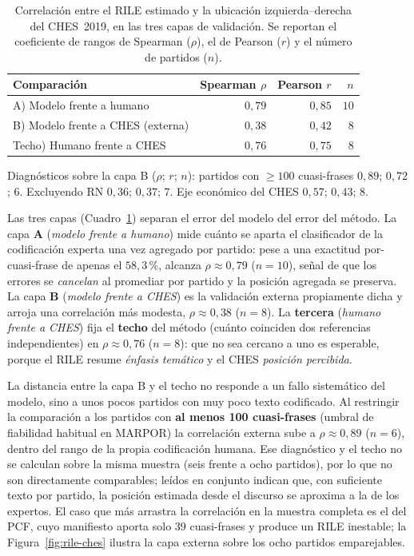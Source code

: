 \begin{table}[H]
\centering
\caption{Correlación entre el RILE estimado y la ubicación izquierda--derecha del
CHES~2019, en las tres capas de validación. Se reportan el coeficiente de rangos
de Spearman ($\rho$), el de Pearson ($r$) y el número de partidos ($n$).}
\label{tab:val-ches}
\begin{tabular}{@{}l r r r@{}}
\toprule
\textbf{Comparación} & \textbf{Spearman $\rho$} & \textbf{Pearson $r$} & \textbf{$n$} \\
\midrule
A) Modelo frente a humano & $0{,}79$ & $0{,}85$ & $10$ \\
B) Modelo frente a CHES (externa) & $0{,}38$ & $0{,}42$ & $8$ \\
Techo) Humano frente a CHES & $0{,}76$ & $0{,}75$ & $8$ \\
\bottomrule
\end{tabular}

{\footnotesize Diagnósticos sobre la capa B ($\rho$; $r$; $n$): partidos con
$\geq 100$ cuasi-frases $0{,}89$; $0{,}72$; $6$. Excluyendo RN $0{,}36$; $0{,}37$;
$7$. Eje económico del CHES $0{,}57$; $0{,}43$; $8$.}
\end{table}

Las tres capas (Cuadro~\ref{tab:val-ches}) separan el error del modelo del error
del método. La capa \textbf{A} (\emph{modelo frente a humano}) mide cuánto se
aparta el clasificador de la codificación experta una vez agregado por partido:
pese a una exactitud por-cuasi-frase de apenas el $58{,}3\,\%$, alcanza
$\rho \approx 0{,}79$ ($n=10$), señal de que los errores se \emph{cancelan} al
promediar por partido y la posición agregada se preserva. La capa \textbf{B}
(\emph{modelo frente a CHES}) es la validación externa propiamente dicha y arroja
una correlación más modesta, $\rho \approx 0{,}38$ ($n=8$). La \textbf{tercera}
(\emph{humano frente a CHES}) fija el \textbf{techo} del método (cuánto
coinciden dos referencias independientes) en $\rho \approx 0{,}76$ ($n=8$): que
no sea cercano a uno es esperable, porque el RILE resume \emph{énfasis temático} y
el CHES \emph{posición percibida}.

La distancia entre la capa B y el techo no responde a un fallo sistemático del
modelo, sino a unos pocos partidos con muy poco texto codificado. Al restringir
la comparación a los partidos con \textbf{al menos 100 cuasi-frases} (umbral de
fiabilidad habitual en MARPOR) la correlación externa sube a
$\rho \approx 0{,}89$ ($n=6$), dentro del rango de la propia codificación humana.
Ese diagnóstico y el techo no se calculan sobre la misma muestra (seis frente a
ocho partidos), por lo que no son directamente comparables; leídos en conjunto
indican que, con suficiente texto por partido, la posición estimada desde el
discurso se aproxima a la de los expertos. El caso que más arrastra la
correlación en la muestra completa es el del PCF, cuyo manifiesto aporta solo 39
cuasi-frases y produce un RILE inestable; la Figura~\ref{fig:rile-ches} ilustra la
capa externa sobre los ocho partidos emparejables.

